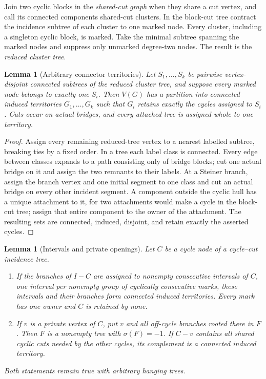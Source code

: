 \documentclass[11pt]{article}
\newtheorem{lemma}[theorem]{Lemma}
\newcommand{\sig}{\sigma}
\begin{document}
Join two cyclic blocks in the \emph{shared-cut graph} when they share a cut
vertex, and call its connected components shared-cut clusters.  In the
block-cut tree contract the incidence subtree of each cluster to one marked
node.  Every cluster, including a singleton cyclic block, is marked.  Take the
minimal subtree spanning the marked nodes and suppress only unmarked
degree-two nodes.  The result is the \emph{reduced cluster tree}.

\begin{lemma}[Arbitrary connector territories]\label{lem:territories}
Let $S_1,\ldots,S_k$ be pairwise vertex-disjoint connected subtrees of the
reduced cluster tree, and suppose every marked node belongs to exactly one
$S_i$.  Then $V(G)$ has a partition into connected induced territories
$G_1,\ldots,G_k$ such that $G_i$ retains exactly the cycles assigned to $S_i$.
Cuts occur on actual bridges, and every attached tree is assigned whole to one
territory.
\end{lemma}

\begin{proof}
Assign every remaining reduced-tree vertex to a nearest labelled subtree,
breaking ties by a fixed order.  In a tree each label class is connected.
Every edge between classes expands to a path consisting only of bridge blocks;
cut one actual bridge on it and assign the two remnants to their labels.  At a
Steiner branch, assign the branch vertex and one initial segment to one class
and cut an actual bridge on every other incident segment.  A component outside
the cyclic hull has a unique attachment to it, for two attachments would make
a cycle in the block-cut tree; assign that entire component to the owner of
the attachment.  The resulting sets are connected, induced, disjoint, and
retain exactly the asserted cycles.
\end{proof}

\begin{lemma}[Intervals and private openings]\label{lem:intervals}
Let $C$ be a cycle node of a cycle--cut incidence tree.
\begin{enumerate}
\item If the branches of $I-C$ are assigned to nonempty consecutive intervals
of $C$, one interval per nonempty group of cyclically consecutive marks, these
intervals and their branches form connected induced territories.  Every mark
has one owner and $C$ is retained by none.
\item If $v$ is a private vertex of $C$, put $v$ and all off-cycle branches
rooted there in $F$.  Then $F$ is a nonempty tree with $\sig(F)=-1$.  If
$C-v$ contains all shared cyclic cuts needed by the other cycles, its
complement is a connected induced territory.
\end{enumerate}
Both statements remain true with arbitrary hanging trees.
\end{lemma}
\end{document}
